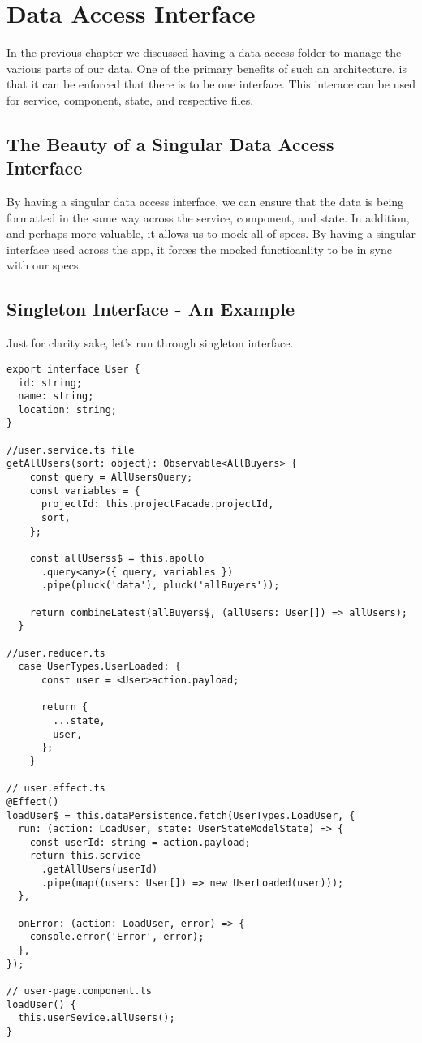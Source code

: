 \maketitle{}
\section{ Data Access Interface }
In the previous chapter we discussed having a data access folder to manage
the various parts of our data. One of the primary benefits of such an
architecture, is that it can be enforced that there is to be one interface. This
interace can be used for service, component, state, and respective files.

\subsection{ The Beauty of a Singular Data Access Interface }
By having a singular data access interface, we can ensure that the data is
being formatted in the same way across the service, component, and state. In
addition, and perhaps more valuable, it allows us to mock all of specs. By
having a singular interface used across the app, it forces the mocked
functioanlity to be in sync with our specs.

\subsection{ Singleton Interface - An Example }
Just for clarity sake, let's run through singleton interface.
\begin{lstlisting}
export interface User {
  id: string;
  name: string;
  location: string;
}

//user.service.ts file
getAllUsers(sort: object): Observable<AllBuyers> {
    const query = AllUsersQuery;
    const variables = {
      projectId: this.projectFacade.projectId,
      sort,
    };

    const allUserss$ = this.apollo
      .query<any>({ query, variables })
      .pipe(pluck('data'), pluck('allBuyers'));

    return combineLatest(allBuyers$, (allUsers: User[]) => allUsers);
  }

//user.reducer.ts
  case UserTypes.UserLoaded: {
      const user = <User>action.payload;

      return {
        ...state,
        user,
      };
    }

// user.effect.ts
@Effect()
loadUser$ = this.dataPersistence.fetch(UserTypes.LoadUser, {
  run: (action: LoadUser, state: UserStateModelState) => {
    const userId: string = action.payload;
    return this.service
      .getAllUsers(userId)
      .pipe(map((users: User[]) => new UserLoaded(user)));
  },

  onError: (action: LoadUser, error) => {
    console.error('Error', error);
  },
});

// user-page.component.ts
loadUser() {
  this.userSevice.allUsers();
}
\end{lstlisting}

